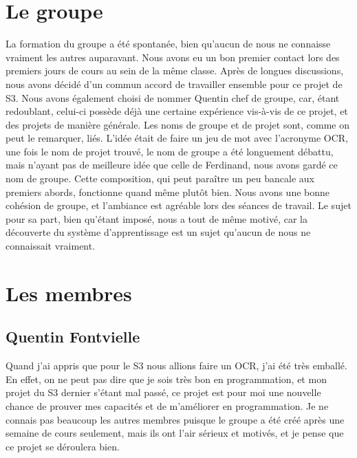 \documentclass[14pt]{article}
\begin{document}
\section{Le groupe}
La formation du groupe a été spontanée, bien qu'aucun de nous ne connaisse vraiment les autres auparavant.
\newline
\indent Nous avons eu un bon premier contact lors des premiers jours de cours au sein de la même classe. Après de longues discussions, nous avons décidé d'un commun accord de travailler ensemble pour ce projet de S3. Nous avons également choisi de nommer Quentin chef de groupe, car, étant redoublant, celui-ci possède déjà une certaine expérience vis-à-vis de ce projet, et des projets de manière générale. 
\newline
\indent Les noms de groupe et de projet sont, comme on peut le remarquer, liés. L'idée était de faire un jeu de mot avec l'acronyme OCR, une fois le nom de projet trouvé, le nom de groupe a été longuement débattu, mais n'ayant pas de meilleure idée que celle de Ferdinand, nous avons gardé ce nom de groupe.  
\newline
\newline
\indent Cette composition, qui peut paraître un peu bancale aux premiers abords, fonctionne quand même plutôt bien. Nous avons une bonne cohésion de groupe, et l'ambiance est agréable lors des séances de travail.
\newline
\newline
\indent Le sujet pour sa part, bien qu'étant imposé, nous a tout de même motivé, car la découverte du système d'apprentissage est un sujet qu'aucun de nous ne connaissait vraiment. 
\newpage
\section{Les membres}
\subsection{Quentin Fontvielle}
Quand j'ai appris que pour le S3 nous allions faire un OCR, j'ai été très emballé. En effet, on ne peut pas dire que je sois très bon en programmation, et mon projet du S3 dernier s'étant mal passé, ce projet est pour moi une nouvelle chance de prouver mes capacités et de m'améliorer en programmation. Je ne connais pas beaucoup les autres membres puisque le groupe a été créé après une semaine de cours seulement, mais ils ont l'air sérieux et motivés, et je pense que ce projet se déroulera bien. 
\newpage
\end{document}
